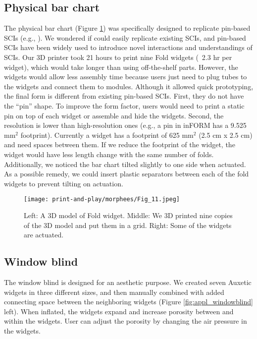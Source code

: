     \subsection{Physical bar chart}
      The physical bar chart (Figure \ref{fig:appl_barchart}) was specifically
      designed to replicate pin-based SCIs (e.g., \cite{10.1145/2501988.2502032,
      Nakagaki:2016jt, 7542185, 10.1145/2858036.2858316,
      10.1145/2702123.2702599}).  We wondered if \mp could easily replicate
      existing SCIs, and pin-based SCIs have been widely used to introduce novel
      interactions and understandings of SCIs.  Our 3D printer took 21 hours to
      print nine Fold widgets (~2.3 hr per widget), which would take longer than
      using off-the-shelf parts. However, the widgets would allow less assembly
      time because users just need to plug tubes to the widgets and connect them
      to modules.  Although it allowed quick prototyping, the final form is
      different from existing pin-based SCIs. First, they do not have the
      ``pin'' shape. To improve the form factor, users would need to print a
      static pin on top of each widget or assemble and hide the widgets. Second,
      the resolution is lower than high-resolution ones (e.g., a pin in inFORM
      \cite{10.1145/2501988.2502032} has a 9.525 mm$^2$ footprint). Currently a
      widget has a footprint of 625 mm$^2$ (2.5 cm x 2.5 cm) and need spaces
      between them. If we reduce the footprint of the widget, the widget would
      have less length change with the same number of folds. Additionally, we
      noticed the bar chart tilted slightly to one side when actuated. As a
      possible remedy, we could insert plastic separators between each of the
      fold widgets to prevent tilting on actuation.
        
      \begin{figure}[htb]
        \centering
        \texttt{[image: print-and-play/morphees/Fig\_11.jpeg]}
        \caption{Left: A 3D model of Fold widget. Middle: We 3D printed nine
          copies of the 3D model and put them in a grid. Right: Some of the
          widgets are actuated.}
        \label{fig:appl_barchart}
      \end{figure}
    
    \subsection{Window blind}
      The window blind is designed for an aesthetic purpose. We created seven
      Auxetic widgets in three different sizes, and then manually combined with
      added connecting space between the neighboring widgets
      (Figure \ref{fig:appl_windowblind} left). When inflated, the widgets
      expand and increase porosity between and within the widgets. User can
      adjust the porosity by changing the air pressure in the widgets.
        
